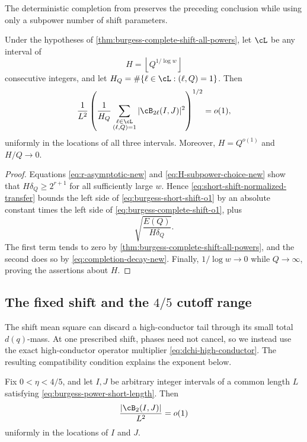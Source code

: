 The deterministic completion from \citet{WangCenteredKernels2026} preserves
the preceding conclusion while using only a subpower number of shift
parameters.

\begin{corollary}
\label{cor:burgess-short-shift-all-powers}
Under the hypotheses of \cref{thm:burgess-complete-shift-all-powers}, let
$\cL$ be any interval of
\begin{equation}\label{eq:burgess-short-shift-H}
 H=\left\lfloor Q^{1/\log w}\right\rfloor
\end{equation}
consecutive integers, and let
$H_Q=\#\{\ell\in\cL:(\ell,Q)=1\}$.  Then
\begin{equation}\label{eq:burgess-short-shift-o1}
 \frac1{L^2}
 \left(
  \frac1{H_Q}
  \sum_{\substack{\ell\in\cL\\(\ell,Q)=1}}
  |\cB_{2\ell}(I,J)|^2
 \right)^{1/2}=o(1),
\end{equation}
uniformly in the locations of all three intervals.  Moreover,
$H=Q^{o(1)}$ and $H/Q\to0$.
\end{corollary}

\begin{proof}
Equations \eqref{eq:r-asymptotic-new} and
\eqref{eq:H-subpower-choice-new} show that
$H\delta_Q\ge2^{r+1}$ for all sufficiently large $w$.  Hence
\eqref{eq:short-shift-normalized-transfer} bounds the left side of
\eqref{eq:burgess-short-shift-o1} by an absolute constant times the left side
of \eqref{eq:burgess-complete-shift-o1}, plus
\[
 \sqrt{\frac{E(Q)}{H\delta_Q}}.
\]
The first term tends to zero by
\cref{thm:burgess-complete-shift-all-powers}, and the second does so by
\eqref{eq:completion-decay-new}.  Finally,
$1/\log w\to0$ while $Q\to\infty$, proving the assertions about $H$.
\end{proof}

\subsection{The fixed shift and the \texorpdfstring{$4/5$}{4/5} cutoff range}
\label{subsec:burgess-fixed-shift}

The shift mean square can discard a high-conductor tail through its small
total $d(q)$-mass.  At one prescribed shift, phases need not cancel, so we
instead use the exact high-conductor operator multiplier
\eqref{eq:dchi-high-conductor}.  The resulting compatibility condition
explains the exponent below.

\begin{theorem}
\label{thm:burgess-fixed-shift-four-fifths}
Fix $0<\eta<4/5$, and let $I,J$ be arbitrary integer intervals of a common
length $L$ satisfying \eqref{eq:burgess-power-short-length}.  Then
\begin{equation}\label{eq:burgess-fixed-shift-o1}
 \frac{|\cB_2(I,J)|}{L^2}=o(1)
\end{equation}
uniformly in the locations of $I$ and $J$.
\end{theorem}

